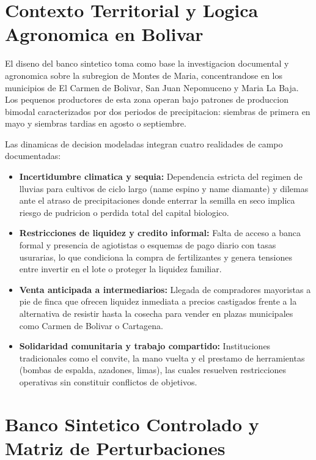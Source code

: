 \documentclass[11pt,a4paper]{article}
\begin{document}
\section{Contexto Territorial y Logica Agronomica en Bolivar}

El diseno del banco sintetico toma como base la investigacion documental y agronomica sobre la subregion de Montes de Maria, concentrandose en los municipios de El Carmen de Bolivar, San Juan Nepomuceno y Maria La Baja. Los pequenos productores de esta zona operan bajo patrones de produccion bimodal caracterizados por dos periodos de precipitacion: siembras de primera en mayo y siembras tardias en agosto o septiembre.

Las dinamicas de decision modeladas integran cuatro realidades de campo documentadas:
\begin{itemize}[itemsep=2pt]
    \item \textbf{Incertidumbre climatica y sequia:} Dependencia estricta del regimen de lluvias para cultivos de ciclo largo (name espino y name diamante) y dilemas ante el atraso de precipitaciones donde enterrar la semilla en seco implica riesgo de pudricion o perdida total del capital biologico.
    \item \textbf{Restricciones de liquidez y credito informal:} Falta de acceso a banca formal y presencia de agiotistas o esquemas de pago diario con tasas usurarias, lo que condiciona la compra de fertilizantes y genera tensiones entre invertir en el lote o proteger la liquidez familiar.
    \item \textbf{Venta anticipada a intermediarios:} Llegada de compradores mayoristas a pie de finca que ofrecen liquidez inmediata a precios castigados frente a la alternativa de resistir hasta la cosecha para vender en plazas municipales como Carmen de Bolivar o Cartagena.
    \item \textbf{Solidaridad comunitaria y trabajo compartido:} Instituciones tradicionales como el convite, la mano vuelta y el prestamo de herramientas (bombas de espalda, azadones, limas), las cuales resuelven restricciones operativas sin constituir conflictos de objetivos.
\end{itemize}

\section{Banco Sintetico Controlado y Matriz de Perturbaciones}
\end{document}

